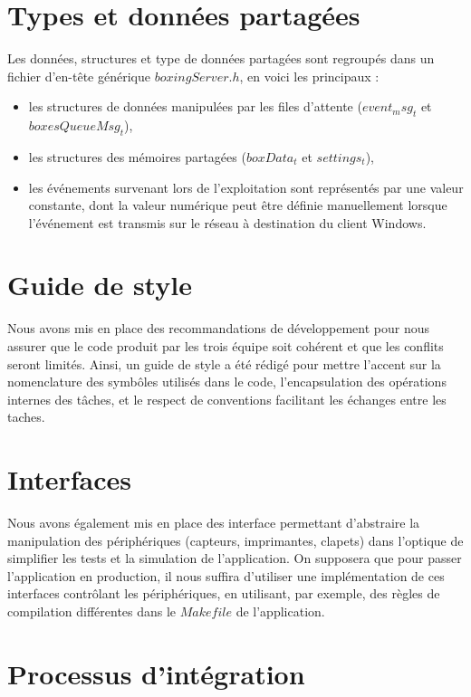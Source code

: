 \section{Types et données partagées}

Les données, structures et type de données partagées sont regroupés dans un
fichier d'en-tête générique $boxingServer.h$, en voici les principaux :

\begin{itemize}
	\item les structures de données manipulées par les files d'attente
($event_msg_t$ et $boxesQueueMsg_t$),
	\item les structures des mémoires partagées ($boxData_t$ et $settings_t$),
	\item les événements survenant lors de l'exploitation sont représentés par
une valeur constante, dont la valeur numérique peut être définie manuellement
lorsque l'événement est transmis sur le réseau à destination du client Windows.
\end{itemize}

\section{Guide de style}

Nous avons mis en place des recommandations de développement pour nous assurer
que le code produit par les trois équipe soit cohérent et que les conflits
seront limités. Ainsi, un guide de style a été rédigé pour mettre l'accent sur
la nomenclature des symbôles utilisés dans le code, l'encapsulation des
opérations internes des tâches, et le respect de conventions facilitant les
échanges entre les taches.

\section{Interfaces}

Nous avons également mis en place des interface permettant d'abstraire la
manipulation des périphériques (capteurs, imprimantes, clapets) dans l'optique
de simplifier les tests et la simulation de l'application. On supposera que
pour passer l'application en production, il nous suffira d'utiliser une
implémentation de ces interfaces contrôlant les périphériques, en utilisant,
par exemple, des règles de compilation différentes dans le $Makefile$ de
l'application.

\section{Processus d'intégration}

